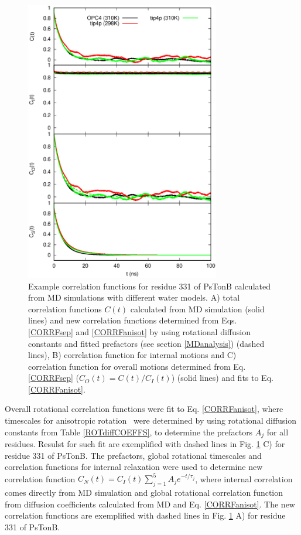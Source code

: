 \documentclass[pre,aps,floatfix,authordate1-4,twocolumn]{revtex4-1}
\begin{document}
\begin{figure}[!h]
  \includegraphics[width=8.5cm]{../Figs/exampleCORRF.eps}%
  \caption{Example correlation functions for residue 331 of PsTonB calculated from MD simulations with different water models.
    A) total correlation functions $C(t)$ calculated from MD simulation (solid lines) and
    new correlation functions determined from Eqs. \ref{CORRFsep} and \ref{CORRFanisot} by
    using rotational diffusion constants and fitted prefactors (see section \ref{MDanalysis}) (dashed lines),
    B) correlation function for internal motions and %
    C) correlation function for overall motions determined from Eq. \ref{CORRFsep} ($C_O(t)=C(t)/C_I(t)$) (solid lines) and
    fits to Eq. \ref{CORRFanisot}.
    }\label{exampleCORRF}
\end{figure}

Overall rotational correlation functions were fit to Eq.  \ref{CORRFanisot}, where
timescales for anisotropic rotation~\cite{Note1} were determined by using rotational diffusion constants
from Table \ref{ROTdiffCOEFFS}, to determine the prefactors $A_j$ for all residues.
Resulst for such fit are exemplified with dashed lines in Fig. \ref{exampleCORRF} C) for residue 331 of PsTonB.
The prefactors, global rotational timescales and correlation functions for internal relaxation
were used to determine new correlation function $C_N(t)=C_I(t)\sum_{j=1}^5 A_j e^{-t/\tau_j}$,
where internal correlation comes directly from MD simulation and global rotational correlation
function from diffusion coefficients calculated from MD and Eq. \ref{CORRFanisot}. The new correlation
functions are exemplified with dashed lines in Fig. \ref{exampleCORRF} A) for residue 331 of PsTonB.
\end{document}
